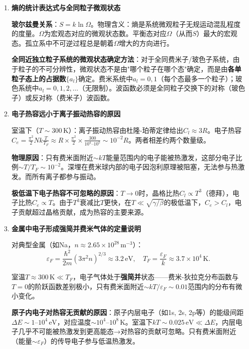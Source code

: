 \documentclass[12pt,a4paper,fontset=mac]{ctexart}
\newcommand{\đ}{\mathrm{đ}}
\begin{document}
\begin{enumerate}
\textbf{非临界态稳定性条件}：$C_V>0$，$\left(\frac{\partial p}{\partial V}\right)_T<0$。

\textbf{物理含义}：$C_V>0$→热稳定（如果某区域温度偏高，它会向周围放热降温回到平衡）；$\left(\frac{\partial p}{\partial V}\right)_T<0$→力学稳定（如果某区域被意外压缩，压强增大会使其膨胀恢复）。任一条件被违反，小的涨落会被正反馈放大→系统失稳→发生相变。

\item \textbf{熵的统计表达式与全同粒子微观状态}

\textbf{玻尔兹曼关系}：$S=k\ln\Omega$。物理含义：熵是系统微观粒子无规运动混乱程度的度量。$\Omega$为宏观态对应的微观状态数。平衡态对应$\Omega$（从而$S$）最大的宏观态。孤立系中不可逆过程总是朝着$\Omega$增大的方向进行。

\textbf{全同近独立粒子系统的微观状态确定方法}：对于全同费米子/玻色子系统，由于粒子的不可分辨性，微观状态不是由"哪个粒子在哪个态"确定，而是由\textbf{各单粒子态上的占据数}$\{a_l\}$确定。费米系统中$a_l=0,1$（每个态最多一个粒子）；玻色系统中$a_l=0,1,2,\ldots$（无限制）。波函数必须是全同粒子交换下的对称（玻色子）或反对称（费米子）波函数。

\item \textbf{电子热容远小于离子振动热容的原因}

室温下（$T\sim300\,\text{K}$）：离子振动热容由杜隆-珀蒂定律给出$C_l\approx 3R$。电子热容$C_e=\frac{\pi^2}{2}Nk\frac{T}{T_F}\approx R\times\frac{\pi^2}{2}\times\frac{300}{10^4\text{--}10^5}\sim10^{-2}R$。两者相差约两个数量级。

\textbf{物理原因}：只有费米面附近$\sim kT$能量范围内的电子能被热激发，这部分电子比例$\sim T/T_F\sim10^{-2}$。深埋在费米球内部的电子因泡利原理被阻塞，无法参与热激发。而所有离子都参与振动。

\textbf{极低温下电子热容不可忽略的原因}：$T\to0$时，晶格比热$C_l\propto T^3$（德拜），电子比热$C_e\propto T$。由于$T^3$衰减比$T$更快，在$T\ll\sqrt{\gamma/\beta}$的极低温下，$C_e>C_l$，电子贡献超过晶格贡献，成为热容的主要来源。

\item \textbf{金属中电子形成强简并费米气体的定量说明}

对典型金属（如Na，$n\approx2.65\times10^{28}\,\text{m}^{-3}$）：
\[\varepsilon_F=\frac{\hbar^2}{2m}(3\pi^2n)^{2/3}\approx3.2\,\text{eV},\quad T_F=\frac{\varepsilon_F}{k}\approx3.7\times10^4\,\text{K}.\]

室温$T\approx300\,\text{K}\ll T_F$，电子气体处于\textbf{强简并}状态——费米-狄拉克分布函数与$T=0$的阶跃函数差别极小，只有费米面附近$\sim kT/\varepsilon_F\sim0.01$范围内的分布有微小变化。

\textbf{原子内电子对热容无贡献的原因}：原子内层电子（如1s, 2s, 2p等）的能级间距$\Delta E\sim1\text{--}10^4\,\text{eV}$，对应温度$\sim10^4\text{--}10^8\,\text{K}$。室温下$kT\sim0.025\,\text{eV}\ll\Delta E$，内层电子几乎不可能被热激发到更高能态→对热容的贡献可忽略。只有费米面附近（能量$\sim\varepsilon_F$）的传导电子参与低温热激发。

\end{enumerate}
\end{document}
